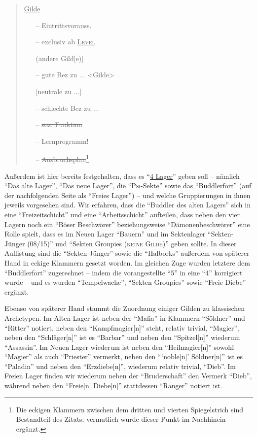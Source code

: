 \documentclass[a5paper,pagesize,numbers=noenddot]{scrbook}
\begin{document}
\begin{quote}
   \uline{Gilde}
   \begin{itemize}
      \item[--] Eintrittsvorauss.
      \item[--] exclusiv ab \textsc{\uline{Level}}
      \item[] \phantom{exclusiv ab} (andere Gild[e)]
      \item[--] gute Bez zu $\ldots$ <Gilde>
      \item[] [neutrale zu $\ldots$]
      \item[--] schlechte Bez zu $\ldots$
      \item[--] \sout{soz. Funktion}
      \item[--] Lernprogramm!
      \item[--] \sout{Ausbruchsplan}\footnote{Die eckigen Klammern zwischen dem dritten und vierten Spiegelstrich sind Bestandteil des Zitats; vermutlich wurde dieser Punkt im Nachhinein ergänzt.}
   \end{itemize}
\end{quote}

Außerdem ist hier bereits festgehalten, dass es \enquote{\uline{4 Lager}} geben soll -- nämlich \enquote{Das alte Lager}, \enquote{Das neue Lager}, die \enquote{\textsc{Psi}-Sekte} sowie das \enquote{Buddlerfort} (auf der nachfolgenden Seite als \enquote{Freies Lager}) -- und welche Gruppierungen in ihnen jeweils vorgesehen sind.
Wir erfahren, dass die \enquote{Buddler des alten Lagers} sich in eine \enquote{Freizeitschicht} und eine \enquote{Arbeitsschicht} aufteilen, dass neben den vier Lagern noch ein \enquote{Böser Beschwörer} beziehungsweise \enquote{Dämonenbeschwörer} eine Rolle spielt, dass es im Neuen Lager \enquote{Bauern} und im Sektenlager \enquote{Sekten-Jünger (08/15)} und \enquote{Sekten Groupies (\textsc{keine Gilde})} geben sollte.
In dieser Auflistung sind die \enquote{Sekten-Jünger} sowie die \enquote{Halborks} außerdem von späterer Hand in eckige Klammern gesetzt worden.
Im gleichen Zuge wurden letztere dem \enquote{Buddlerfort} zugerechnet -- indem die vorangestellte \enquote{5} in eine \enquote{4} korrigiert wurde -- und es wurden \enquote{Tempelwache}, \enquote{Sekten Groupies} sowie \enquote{Freie Diebe} ergänzt.

Ebenso von späterer Hand stammt die Zuordnung einiger Gilden zu klassischen Archetypen.
Im Alten Lager ist neben der \enquote{Mafia} in Klammern \enquote{Söldner} und \enquote{Ritter} notiert, neben den \enquote{Kampfmagier[n]} steht, relativ trivial, \enquote{Magier}, neben den \enquote{Schläger[n]} ist es \enquote{Barbar} und neben den \enquote{Spitzel[n]} wiederum \enquote{Assassin}.
Im Neuen Lager wiederum ist neben den \enquote{Heilmagier[n]} sowohl \enquote{Magier} als auch \enquote{Priester} vermerkt, neben den \enquote{\enquote{noble[n]} Söldner[n]} ist es \enquote{Paladin} und neben den \enquote{Erzdiebe[n]}, wiederum relativ trivial, \enquote{Dieb}.
Im Freien Lager finden wir wiederum neben der \enquote{Bruderschaft} den Vermerk \enquote{Dieb}, während neben den \enquote{Freie[n] Diebe[n]} stattdessen \enquote{Ranger} notiert ist.
\end{document}
